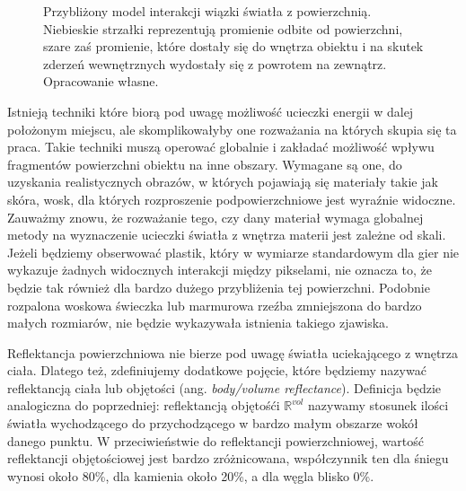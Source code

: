 \documentclass[../main.tex]{subfiles}
\begin{document}
\begin{figure}[h]
  \centering
  \caption{Przybliżony model interakcji wiązki światła z powierzchnią. Niebieskie strzałki reprezentują promienie odbite od powierzchni, szare zaś promienie, które dostały się do wnętrza obiektu i na skutek zderzeń wewnętrznych wydostały się z powrotem na zewnątrz. Opracowanie własne.}
  \label{fig:ReflectionRefraction}
\end{figure}

Istnieją techniki które biorą pod uwagę możliwość ucieczki energii w dalej położonym miejscu, ale skomplikowałyby one rozważania na których skupia się ta praca. Takie techniki muszą operować globalnie i zakładać możliwość wpływu fragmentów powierzchni obiektu na inne obszary. Wymagane są one, do uzyskania realistycznych obrazów, w których pojawiają się materiały takie jak skóra, wosk, dla których rozproszenie podpowierzchniowe jest wyraźnie widoczne. Zauważmy znowu, że rozważanie tego, czy dany materiał wymaga globalnej metody na wyznaczenie ucieczki światła z wnętrza materii jest zależne od skali. Jeżeli będziemy obserwować plastik, który w wymiarze standardowym dla gier nie wykazuje żadnych widocznych interakcji między pikselami, nie oznacza to, że będzie tak również dla bardzo dużego przybliżenia tej powierzchni. Podobnie rozpalona woskowa świeczka lub marmurowa rzeźba zmniejszona do bardzo małych rozmiarów, nie będzie wykazywała istnienia takiego zjawiska.

Reflektancja powierzchniowa nie bierze pod uwagę światła uciekającego z wnętrza ciała. Dlatego też, zdefiniujemy dodatkowe pojęcie, które będziemy nazywać reflektancją ciała lub objętości (ang. \textit{body/volume reflectance}). Definicja będzie analogiczna do poprzedniej: reflektancją objętośći $\mathbb{R}^{\textit{vol}}$ nazywamy stosunek ilości światła wychodzącego do przychodzącego w bardzo małym obszarze wokół danego punktu. W przeciwieństwie do reflektancji powierzchniowej, wartość reflektancji objętościowej jest bardzo zróżnicowana, współczynnik ten dla śniegu wynosi około 80\%, dla kamienia około 20\%, a dla węgla blisko 0\%.
\end{document}
